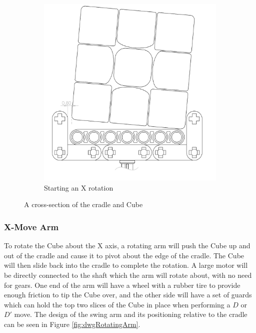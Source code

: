 \documentclass{report}
\begin{document}
\begin{figure}[h!]
\begin{subfigure}[b]{0.25\linewidth}
			\label{fig:dwgCradleCurvedEdgeNormal}
		\end{subfigure}
		\begin{subfigure}[b]{0.25\linewidth}
			\includegraphics[width=\linewidth]{Resources/Images/dwgCradleCurvedEdgeTilted.png}
			\caption{Starting an X rotation}
			\label{fig:dwgCradleCurvedEdgeTilted}
		\end{subfigure}
		\caption{A cross-section of the cradle and Cube}
		\label{fig:CradleDrawings}
	\end{figure}
    
    \subsubsection{X-Move Arm}
    
    To rotate the Cube about the X axis, a rotating arm will push the Cube up and out of the cradle and cause it to pivot about the edge of the cradle. The Cube will then slide back into the cradle to complete the rotation. A large motor will be directly connected to the shaft which the arm will rotate about, with no need for gears. One end of the arm will have a wheel with a rubber tire to provide enough friction to tip the Cube over, and the other side will have a set of guards which can hold the top two slices of the Cube in place when performing a $D$ or $D'$ move. The design of the swing arm and its positioning relative to the cradle can be seen in Figure \ref{fig:dwgRotatingArm}.
    
\end{document}
